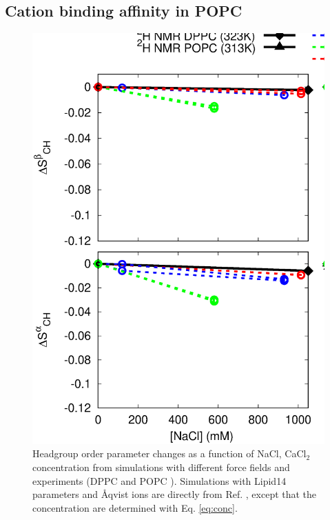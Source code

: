 \documentclass[aip,jcp,twocolumn]{revtex4}
\begin{document}


\subsection{Cation binding affinity in POPC}

\begin{figure}[tbp]
  \centering
  \includegraphics[width=16.0cm]{../Fig/OrdParChanges_NaCl_CaCl2.eps}
  \caption{\label{OrderParameterCHANGESnewMODELS}
    Headgroup order parameter changes as a function of NaCl, CaCl$_2$ concentration
    from simulations with different force fields and experiments (DPPC \cite{akutsu81} and POPC \cite{altenbach84}).
    Simulations with Lipid14 parameters and \AA{}qvist ions are directly from Ref. \cite{catte16}, except that
    the concentration are determined with Eq. \ref{eq:conc}.
  }
\end{figure}
\end{document}

